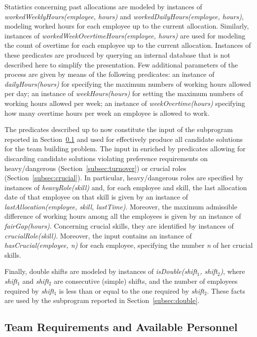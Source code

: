 \documentclass{tlp}
\begin{document}
Statistics concerning past allocations are modeled by instances of
\textit{workedWeeklyHours(employee, hours)} and \textit{workedDailyHours(employee, hours)},
modeling worked hours for each employee up to the current allocation.
Similarly, instances of \textit{workedWeekOvertimeHours(employee, hours)} are used for modeling the count of overtime
for each employee up to the current allocation.
Instances of these predicates are produced
by querying an internal database that is not described here
to simplify the presentation.
Few additional parameters of the process are given by means of the following predicates:
an instance of \textit{dailyHours(hours)} for specifying the maximum numbers of working hours allowed per day;
an instance of \textit{weekHours(hours)} for setting the maximum numbers of working hours allowed per week;
an instance of \textit{weekOvertime(hours)} specifying how many overtime hours per week an employee is allowed to work.

The predicates described up to now constitute the input of the subprogram reported in Section~\ref{subsec:teamRec} and used for effectively produce all candidate solutions for the team building problem.
The input in enriched by predicates allowing for discarding candidate solutions violating preference requirements on heavy/dangerous (Section~\ref{subsec:turnover}) or crucial roles (Section~\ref{subsec:crucial}).
In particular, heavy/dangerous roles are specified by instances of \textit{heavyRole(skill)} and, for each employee and skill, the last allocation date of that employee on that skill is given by an instance of \textit{lastAllocation(employee, skill, lastTime)}.
Moreover, the maximum admissible difference of working hours among all the employees
is given by an instance of \textit{fairGap(hours)}.
Concerning crucial skills, they are identified by instances of \textit{crucialRole(skill)}.
Moreover, the input contains an instance of \textit{hasCrucial(employee, n)} for each employee, specifying the number \textit{n} of her crucial skills.

Finally, double shifts are modeled by instances of \textit{isDouble(shift$_1$, shift$_2$)},
where \textit{shift$_1$} and \textit{shift$_2$} are consecutive (simple) shifts,
and the number of employees required by \textit{shift$_1$} is less than or equal to the one
required by \textit{shift$_2$}.
These facts are used by the subprogram reported in Section~\ref{subsec:double}.


\subsection{Team Requirements and Available Personnel}\label{subsec:teamRec}
\end{document}
